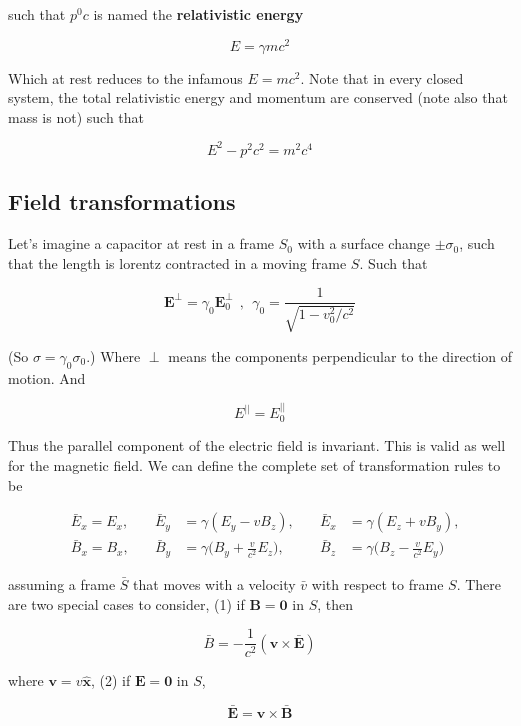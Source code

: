 \documentclass[a4paper]{article}
\begin{document}
such that $p^0c$ is named the \textbf{relativistic energy}

\begin{equation*}
    E=\gamma mc^2
\end{equation*}

Which at rest reduces to the infamous $E=mc^2$. Note that in every closed system, the total relativistic energy and momentum are conserved (note also that mass is not) such that 

\begin{equation*}
    E^2-p^2c^2=m^2c^4
\end{equation*}

\subsection*{Field transformations}

Let's imagine a capacitor at rest in a frame $S_0$ with a surface change $\pm\sigma_0$, such that the length is lorentz contracted in a moving frame $S$. Such that

\begin{equation*}
    \bm{E}^\perp=\gamma_0\bm{E}_0^\perp\ \ , \ \ \gamma_0=\frac{1}{\sqrt{1-v_0^2/c^2}}
\end{equation*}

(So $\sigma=\gamma_0\sigma_0$.) Where $\perp$ means the components perpendicular to the direction of motion. And

\begin{equation*}
    E^{||}=E_0^{||}
\end{equation*}

Thus the parallel component of the electric field is invariant. This is valid as well for the magnetic field. We can define the complete set of transformation rules to be

\begin{align*}
    &\bar{E}_x=E_x,\quad & \bar{E}_y&=\gamma(E_y-vB_z),\quad                       & \bar{E}_x&=\gamma(E_z+vB_y),\\[1em]
    &\bar{B}_x=B_x,\quad & \bar{B}_y&=\gamma\bigg(B_y+\frac{v}{c^2}E_z\bigg),\quad & \bar{B}_z&=\gamma\bigg(B_z-\frac{v}{c^2}E_y\bigg)
\end{align*}

assuming a frame $\bar{S}$ that moves with a velocity $\bar{v}$ with respect to frame $S$. There are two special cases to consider, (1) if $\bm{B}=\bm{0}$ in $S$, then 

\begin{equation*}
    \bar{B}=-\frac{1}{c^2}(\bm{v}\times\bm{\bar{E}})
\end{equation*}

where $\bm{v}=v\bm{\hat{x}}$, (2) if $\bm{E}=\bm{0}$ in $S$,

\begin{equation*}
    \bm{\bar{E}}=\bm{v}\times\bm{\bar{B}}
\end{equation*}
\end{document}
